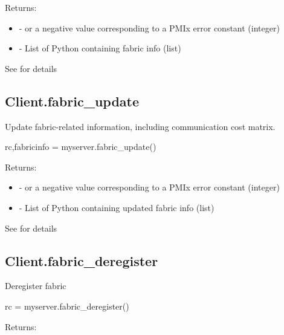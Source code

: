 Returns:

\begin{itemize}
    \item {} -  or a negative value corresponding to a PMIx error constant (integer)
    \item {} - List of Python  containing fabric info (list)
\end{itemize}


See  for details


\subsection{Client.fabric_update}

\summary
Update fabric-related information, including communication cost matrix.

\format

\pyspecificstart
\begin{codepar}
rc,fabricinfo = myserver.fabric_update()
\end{codepar}
\pyspecificend


Returns:

\begin{itemize}
    \item {} -  or a negative value corresponding to a PMIx error constant (integer)
    \item {} - List of Python  containing updated fabric info (list)
\end{itemize}


See  for details


\subsection{Client.fabric_deregister}

\summary
Deregister fabric

\format

\pyspecificstart
\begin{codepar}
rc = myserver.fabric_deregister()
\end{codepar}
\pyspecificend


Returns:

